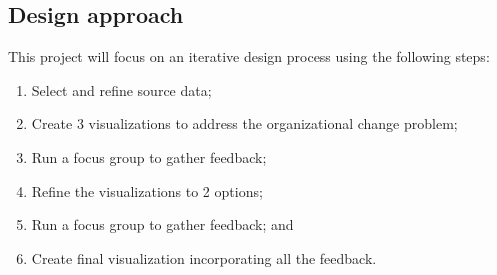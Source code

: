 \documentclass{soups}
\begin{document}
\subsection{Design approach}

This project will focus on an iterative design process using the following steps:

\begin{enumerate}
\item Select and refine source data;
\item Create 3 visualizations to address the organizational change problem;
\item Run a focus group to gather feedback;
\item Refine the visualizations to 2 options;
\item Run a focus group to gather feedback; and
\item Create final visualization incorporating all the feedback.
\end{enumerate}


\printbibliography
\end{document}
